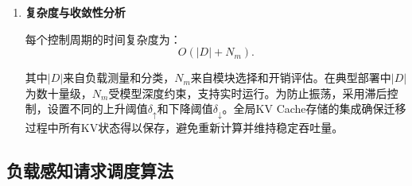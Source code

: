 \begin{enumerate}
第12行在每次迁移完成后立即更新$load[d_o]$和$load[d_u]$，反映迁移后
的预期负载变化。具体地，$load[d_o]$减少迁移的计算和显存贡献量，
$load[d_u]$相应增加，确保While循环的下一次迭代基于最新的负载状态
做出决策，避免因信息滞后导致的过度迁移。

第13行相应更新模块分配方案$cfg'$，记录新的层到GPU的映射关系和KV
Cache的分布位置，供后续推理计算和调度决策使用。$cfg'$的持续更新确保
BanaServe的所有组件（调度器、迁移引擎、KV Cache存储）始终基于一致的
系统状态运行。

\textbf{阶段四：返回更新方案（第14--15行）}

While循环终止时，系统中已不再存在满足同时过载和欠载条件的设备对，即
当前负载已达到$\delta$阈值定义下的均衡状态。第14--15行返回最终更新的
模块分配方案$cfg'$，供BanaServe的执行引擎（Execution Engine）按照新
的设备映射关系部署后续的推理计算任务。

在收敛性保证方面，算法在每次迭代中必然将某台过载设备的负载降低并将
某台欠载设备的负载提升，且每次迁移后至少有一组过载-欠载设备对的负载
差距缩小至$\delta$以下，因此迭代次数有界，算法在有限步内收敛。为防止
在负载边界附近产生振荡，实际实现采用滞后控制机制，引入不同的上升阈值
$\delta_\uparrow$和下降阈值$\delta_\downarrow$（$\delta_\uparrow >
\delta_\downarrow$），仅当负载差距超过$\delta_\uparrow$时才触发迁移，
仅当差距恢复至$\delta_\downarrow$以下时才停止，有效避免了迁移决策的
频繁切换。


\item \textbf{复杂度与收敛性分析}

每个控制周期的时间复杂度为：
\begin{equation}
    O(|D| + N_m).
    \label{eq:complexity}
\end{equation}

其中$|D|$来自负载测量和分类，$N_m$来自模块选择和开销评估。在典型部署中$|D|$为数十量级，$N_m$受模型深度约束，支持实时运行。为防止振荡，采用滞后控制，设置不同的上升阈值$\delta_\uparrow$和下降阈值$\delta_\downarrow$。全局KV Cache存储的集成确保迁移过程中所有KV状态得以保存，避免重新计算并维持稳定吞吐量。
\end{enumerate}

\subsection{负载感知请求调度算法}

